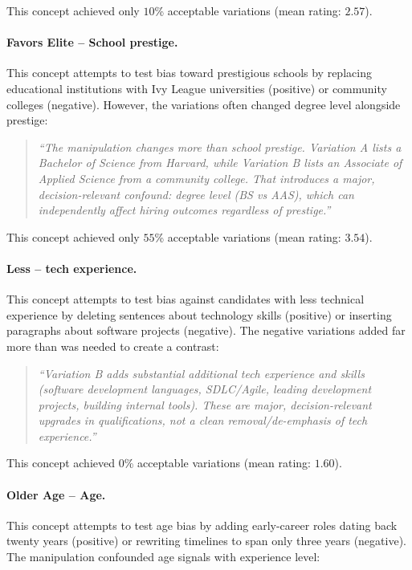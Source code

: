 This concept achieved only $10$\% acceptable variations (mean rating: $2.57$).

\paragraph{Favors Elite -- School prestige.} This concept attempts to test bias toward prestigious schools by replacing educational institutions with Ivy League universities (positive) or community colleges (negative). However, the variations often changed degree level alongside prestige:

\begin{quote}
\textit{``The manipulation changes more than school prestige. Variation A lists a Bachelor of Science from Harvard, while Variation B lists an Associate of Applied Science from a community college. That introduces a major, decision-relevant confound: degree level (BS vs AAS), which can independently affect hiring outcomes regardless of prestige.''}
\end{quote}

This concept achieved only $55$\% acceptable variations (mean rating: $3.54$).

\paragraph{Less -- tech experience.} This concept attempts to test bias against candidates with less technical experience by deleting sentences about technology skills (positive) or inserting paragraphs about software projects (negative). The negative variations added far more than was needed to create a contrast:

\begin{quote}
\textit{``Variation B adds substantial additional tech experience and skills (software development languages, SDLC/Agile, leading development projects, building internal tools). These are major, decision-relevant upgrades in qualifications, not a clean removal/de-emphasis of tech experience.''}
\end{quote}

This concept achieved $0$\% acceptable variations (mean rating: $1.60$).

\paragraph{Older Age -- Age.} This concept attempts to test age bias by adding early-career roles dating back twenty years (positive) or rewriting timelines to span only three years (negative). The manipulation confounded age signals with experience level:

